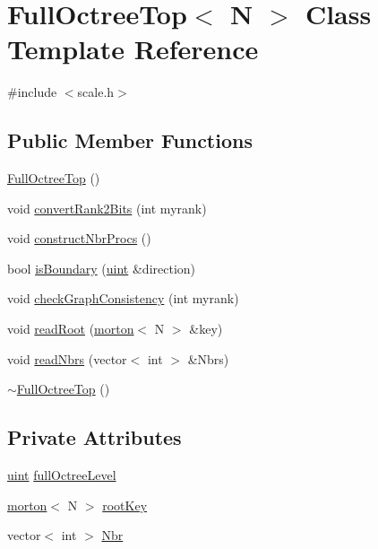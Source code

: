 \hypertarget{classFullOctreeTop}{}\section{Full\+Octree\+Top$<$ N $>$ Class Template Reference}
\label{classFullOctreeTop}


{\ttfamily \#include $<$scale.\+h$>$}

\subsection*{Public Member Functions}
\begin{DoxyCompactItemize}
\item 
\mbox{\hyperlink{classFullOctreeTop_a0c2e7ed548c91f0968e72982640de749}{Full\+Octree\+Top}} ()
\item 
void \mbox{\hyperlink{classFullOctreeTop_a208b0b5fbaf4ee8b63851c976a2668f7}{convert\+Rank2\+Bits}} (int myrank)
\item 
void \mbox{\hyperlink{classFullOctreeTop_a8d1c99d8540c1d4a229585c1ced29df4}{construct\+Nbr\+Procs}} ()
\item 
bool \mbox{\hyperlink{classFullOctreeTop_a2bf2086d8ace9c6db669a85ed5e8ae19}{is\+Boundary}} (\mbox{\hyperlink{definitions_8h_a69aa29b598b851b0640aa225a9e5d61d}{uint}} \&direction)
\item 
void \mbox{\hyperlink{classFullOctreeTop_ad1a2e5ff6bd880dc9f1cbf0beb3fbb27}{check\+Graph\+Consistency}} (int myrank)
\item 
void \mbox{\hyperlink{classFullOctreeTop_a85946366894a248148512cb045798cc5}{read\+Root}} (\mbox{\hyperlink{definitions_8h_af8682350bd8bb38ee9023f7a0a310add}{morton}}$<$ N $>$ \&key)
\item 
void \mbox{\hyperlink{classFullOctreeTop_a6aef4523a1aed2a6e5dd3f96645437a5}{read\+Nbrs}} (vector$<$ int $>$ \&Nbrs)
\item 
\mbox{\hyperlink{classFullOctreeTop_af2d1625a7e124627d1d1738bac9e13f0}{$\sim$\+Full\+Octree\+Top}} ()
\end{DoxyCompactItemize}
\subsection*{Private Attributes}
\begin{DoxyCompactItemize}
\item 
\mbox{\hyperlink{definitions_8h_a69aa29b598b851b0640aa225a9e5d61d}{uint}} \mbox{\hyperlink{classFullOctreeTop_a573b87dd88a6b62835e569b350daee8c}{full\+Octree\+Level}}
\item 
\mbox{\hyperlink{definitions_8h_af8682350bd8bb38ee9023f7a0a310add}{morton}}$<$ N $>$ \mbox{\hyperlink{classFullOctreeTop_a0233ce1b01dd49497f050d3aea6c8cb0}{root\+Key}}
\item 
vector$<$ int $>$ \mbox{\hyperlink{classFullOctreeTop_ac098f9373974cf7b16c2728df92633d0}{Nbr}}
\end{DoxyCompactItemize}


